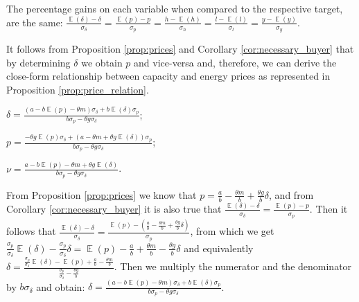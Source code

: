 \documentclass[informs]{informs3}
\begin{document}
\begin{corollary}\label{cor:necessary_buyer}
	The percentage gains on each variable when compared to the respective target, are the same:
$\frac{\mathop{\mathbb{E}}\left(\delta\right)-\delta}{\sigma_{\delta}}= \frac{\mathop{\mathbb{E}}\left(p\right)-p}{\sigma_{p}}=\frac{h-\mathop{\mathbb{E}}\left(h\right)}{\sigma_{h}}=\frac{l-\mathop{\mathbb{E}}\left(l\right)}{\sigma_{l}}=
\frac{y-\mathop{\mathbb{E}}\left(y\right)}{\sigma_{y}}$.
\end{corollary}


It follows from Proposition \ref{prop:prices} and Corollary \ref{cor:necessary_buyer} that by determining $\delta$ we obtain $p$ and vice-versa and, therefore, we can derive the close-form relationship between capacity and energy prices as represented in Proposition \ref{prop:price_relation}.


\begin{proposition}\label{prop:price_relation}
	
$\delta=\frac{\left(a-b\mathop{\mathbb{E}}\left(p\right) -\theta m\right)\sigma_{\delta}+b\mathop{\mathbb{E}}\left(\delta\right)\sigma_{p}}{b\sigma_{p}-\theta g\sigma_{\delta}}$;

$p =\frac{-\theta g \mathop{\mathbb{E}}\left(p\right)\sigma_{\delta}+\left(a-\theta m+\theta g \mathop{\mathbb{E}}\left(\delta\right)\right)\sigma_{p}}{b\sigma_{p}-\theta g\sigma_{\delta}}$;	


$\nu =\frac{a-b \mathop{\mathbb{E}}\left(p\right)-\theta m+\theta g \mathop{\mathbb{E}}\left(\delta\right)}{b\sigma_{p}-\theta g\sigma_{\delta}}$.
\end{proposition}

From Proposition \ref{prop:prices} we know that $p =\frac{a}{b}-\frac{\theta m}{b}+\frac{\theta g }{b}\delta$, and from  Corollary \ref{cor:necessary_buyer} it is also true that $\frac{\mathop{\mathbb{E}}\left(\delta\right)-\delta}{\sigma_{\delta}}= \frac{\mathop{\mathbb{E}}\left(p\right)-p}{\sigma_{p}}$. Then it follows that $\frac{\mathop{\mathbb{E}}\left(\delta\right)-\delta}{\sigma_{\delta}}=\frac{\mathop{\mathbb{E}}\left(p\right)-(\frac{a}{b}-\frac{\theta m}{b}+\frac{\theta g }{b}\delta)}{\sigma_{p}}$, from which we get 
$\frac{\sigma_{p}}{\sigma_{\delta}}\mathop{\mathbb{E}}\left(\delta\right)-\frac{\sigma_{p}}{\sigma_{\delta}}\delta=\mathop{\mathbb{E}}\left(p\right)-\frac{a}{b}+\frac{\theta m}{b}-\frac{\theta g }{b}\delta$ and equivalently
$\delta=\frac{\frac{\sigma_{p}}{\sigma_{\delta}}\mathop{\mathbb{E}}\left(\delta\right)-\mathop{\mathbb{E}}\left(p\right)+\frac{a}{b}-\frac{\theta m}{b}}{\frac{\sigma_{p}}{\sigma_{\delta}}-\frac{\theta g }{b}}$. Then we multiply the numerator and the denominator by $b\sigma_{\delta}$ and obtain:
$\delta=\frac{\left(a-b\mathop{\mathbb{E}}\left(p\right) -\theta m\right)\sigma_{\delta}+b\mathop{\mathbb{E}}\left(\delta\right)\sigma_{p}}{b\sigma_{p}-\theta g\sigma_{\delta}}$.
\end{document}
